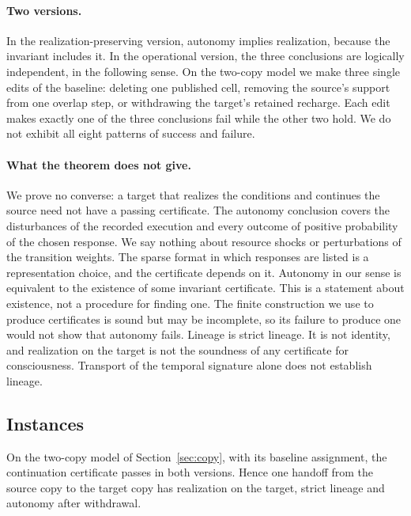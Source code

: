 \paragraph{Two versions.}
In the realization-preserving version, autonomy implies realization, because
the invariant includes it. In the operational version, the three conclusions
are logically independent, in the following sense. On the two-copy model we
make three single edits of the baseline: deleting one published cell, removing
the source's support from one overlap step, or withdrawing the target's
retained recharge. Each edit makes exactly one of the three conclusions fail while the
other two hold. We do not exhibit all eight patterns of success and failure.

\paragraph{What the theorem does not give.}
We prove no converse: a target that realizes the conditions and continues the
source need not have a passing certificate. The autonomy conclusion covers the
disturbances of the recorded execution and every outcome of positive
probability of the chosen response. We say nothing about resource shocks or
perturbations of the transition weights. The sparse format in which responses
are listed is a representation choice, and the certificate depends on it.
Autonomy in our sense is equivalent to the existence of some invariant
certificate. This is a statement about existence, not a procedure for finding
one. The finite construction we use to produce certificates is sound but may
be incomplete, so its failure to produce one would not show that autonomy
fails.
Lineage is strict lineage. It is not identity, and realization on the target is
not the soundness of any certificate for consciousness. Transport of the
temporal signature alone does not establish lineage.

\subsection{Instances}

\begin{proposition}
\label{prop:instance}
On the two-copy model of Section~\ref{sec:copy}, with its baseline
assignment, the continuation certificate passes in both versions. Hence one
handoff from the source copy to the target copy has realization on the target,
strict lineage and autonomy after withdrawal.
\end{proposition}

